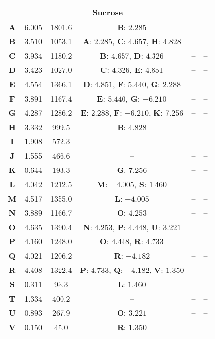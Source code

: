 \begin{longtable}[h!]{c c c c c c}
\hline
\multicolumn{6}{c}{\textbf{Sucrose}}\\
\hline
\textbf{A} & 6.005 & 1801.6 & \textbf{B}: $2.285$& --& -- \\
\textbf{B} & 3.510 & 1053.1 & \textbf{A}: $2.285$, \textbf{C}: $4.657$, \textbf{H}: $4.828$& --& -- \\
\textbf{C} & 3.934 & 1180.2 & \textbf{B}: $4.657$, \textbf{D}: $4.326$& --& -- \\
\textbf{D} & 3.423 & 1027.0 & \textbf{C}: $4.326$, \textbf{E}: $4.851$& --& -- \\
\textbf{E} & 4.554 & 1366.1 & \textbf{D}: $4.851$, \textbf{F}: $5.440$, \textbf{G}: $2.288$& --& -- \\
\textbf{F} & 3.891 & 1167.4 & \textbf{E}: $5.440$, \textbf{G}: $-6.210$& --& -- \\
\textbf{G} & 4.287 & 1286.2 & \textbf{E}: $2.288$, \textbf{F}: $-6.210$, \textbf{K}: $7.256$& --& -- \\
\textbf{H} & 3.332 & 999.5 & \textbf{B}: $4.828$& --& -- \\
\textbf{I} & 1.908 & 572.3 & --& --& -- \\
\textbf{J} & 1.555 & 466.6 & --& --& -- \\
\textbf{K} & 0.644 & 193.3 & \textbf{G}: $7.256$& --& -- \\
\textbf{L} & 4.042 & 1212.5 & \textbf{M}: $-4.005$, \textbf{S}: $1.460$& --& -- \\
\textbf{M} & 4.517 & 1355.0 & \textbf{L}: $-4.005$& --& -- \\
\textbf{N} & 3.889 & 1166.7 & \textbf{O}: $4.253$& --& -- \\
\textbf{O} & 4.635 & 1390.4 & \textbf{N}: $4.253$, \textbf{P}: $4.448$, \textbf{U}: $3.221$& --& -- \\
\textbf{P} & 4.160 & 1248.0 & \textbf{O}: $4.448$, \textbf{R}: $4.733$& --& -- \\
\textbf{Q} & 4.021 & 1206.2 & \textbf{R}: $-4.182$& --& -- \\
\textbf{R} & 4.408 & 1322.4 & \textbf{P}: $4.733$, \textbf{Q}: $-4.182$, \textbf{V}: $1.350$& --& -- \\
\textbf{S} & 0.311 & 93.3 & \textbf{L}: $1.460$& --& -- \\
\textbf{T} & 1.334 & 400.2 & --& --& -- \\
\textbf{U} & 0.893 & 267.9 & \textbf{O}: $3.221$& --& -- \\
\textbf{V} & 0.150 & 45.0 & \textbf{R}: $1.350$& --& -- \\


\end{longtable}
